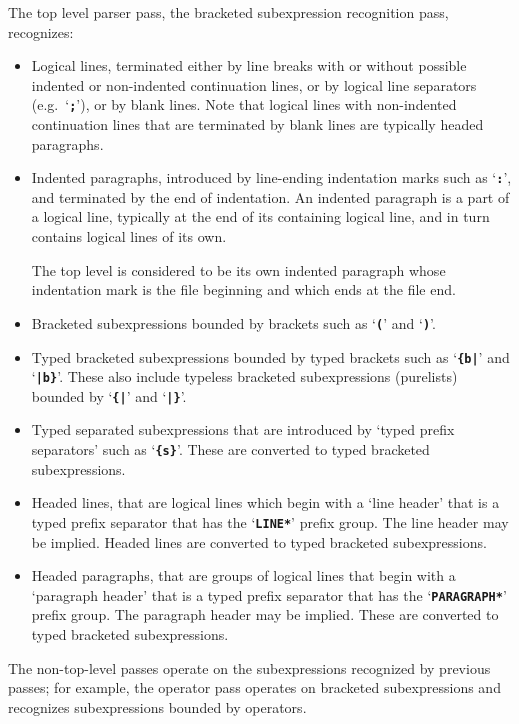 \documentclass[12pt]{article}
\newcommand{\TT}[1]{{\tt \bfseries #1}}
\begin{document}
The top level parser pass, the bracketed subexpression recognition pass,
recognizes:
\begin{itemize}

\item Logical lines, terminated either by line breaks with or without
possible indented or non-indented
continuation lines, or by logical line separators
(e.g.~`\TT{;}'), or by blank lines.  Note that logical
lines with non-indented continuation lines that are
terminated by blank lines are typically headed paragraphs.

\item Indented paragraphs, introduced by line-ending
indentation marks such as `\TT{:}', and terminated by the end of indentation.
An indented paragraph is a part of a logical
line, typically at the end of its containing logical line,
and in turn contains logical lines of its own.

The top level is considered to be its own indented paragraph whose
indentation mark is the file beginning and which ends at the file end.

\item Bracketed subexpressions bounded by brackets
such as `\TT{(}' and `\TT{)}'.

\item Typed bracketed subexpressions bounded by typed brackets
such as `\TT{\{b|}' and `\TT{|b\}}'.  These also include typeless
bracketed subexpressions (purelists) bounded by
`\TT{\{|}' and `\TT{|\}}'.

\item Typed separated subexpressions that are introduced by 
`typed prefix separators' such as `\TT{\{s\}}'.
These are converted to typed bracketed subexpressions.

\item Headed lines, that are logical lines which begin with
a `line header' that is
a typed prefix separator that has the `\TT{*LINE*}' prefix group.
The line header may be implied.
Headed lines are converted to typed bracketed subexpressions.

\item Headed paragraphs, that are groups of logical lines
that begin with a `paragraph header' that is
a typed prefix separator that has the `\TT{*PARAGRAPH*}' prefix group.
The paragraph header may be implied.
These are converted to typed bracketed subexpressions.

\end{itemize}

The non-top-level passes
operate on the subexpressions recognized by previous passes;
for example, the operator pass operates on bracketed subexpressions
and recognizes
subexpressions bounded by operators.
\end{document}
